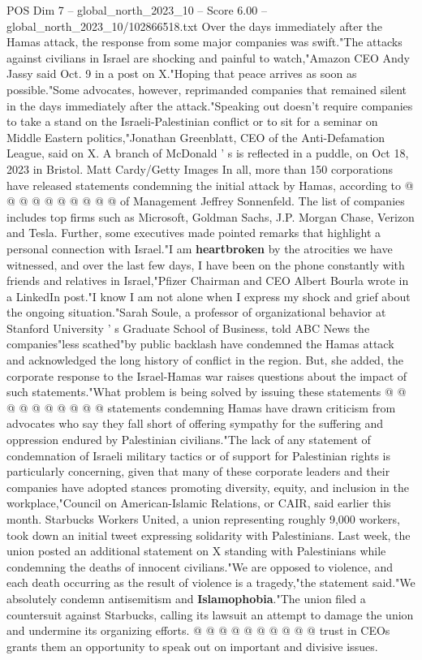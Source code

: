 \begin{textsample}{POS Dim 7 – global\_north\_2023\_10 – Score 6.00 – global\_north\_2023\_10/102866518.txt}
Over the days immediately after the Hamas attack, the response from some major companies was swift."The attacks against civilians in Israel are shocking and painful to watch,"Amazon CEO Andy Jassy said Oct. 9 in a post on X."Hoping that peace arrives as soon as possible."Some advocates, however, reprimanded companies that remained silent in the days immediately after the attack."Speaking out doesn't require companies to take a stand on the Israeli-Palestinian conflict or to sit for a seminar on Middle Eastern politics,"Jonathan Greenblatt, CEO of the Anti-Defamation League, said on X.
A branch of McDonald ' s is reflected in a puddle, on Oct 18, 2023 in Bristol.
Matt Cardy/Getty Images In all, more than 150 corporations have released statements condemning the initial attack by Hamas, according to @ @ @ @ @ @ @ @ @ @ of Management Jeffrey Sonnenfeld.
The list of companies includes top firms such as Microsoft, Goldman Sachs, J.P.
Morgan Chase, Verizon and Tesla.
Further, some executives made pointed remarks that highlight a personal connection with Israel."I am \textbf{heartbroken} by the atrocities we have witnessed, and over the last few days, I have been on the phone constantly with friends and relatives in Israel,"Pfizer Chairman and CEO Albert Bourla wrote in a LinkedIn post."I know I am not alone when I express my shock and grief about the ongoing situation."Sarah Soule, a professor of organizational behavior at Stanford University ' s Graduate School of Business, told ABC News the companies"less scathed"by public backlash have condemned the Hamas attack and acknowledged the long history of conflict in the region.
But, she added, the corporate response to the Israel-Hamas war raises questions about the impact of such statements."What problem is being solved by issuing these statements @ @ @ @ @ @ @ @ @ @ statements condemning Hamas have drawn criticism from advocates who say they fall short of offering sympathy for the suffering and oppression endured by Palestinian civilians."The lack of any statement of condemnation of Israeli military tactics or of support for Palestinian rights is particularly concerning, given that many of these corporate leaders and their companies have adopted stances promoting diversity, equity, and inclusion in the workplace,"Council on American-Islamic Relations, or CAIR, said earlier this month.
Starbucks Workers United, a union representing roughly 9,000 workers, took down an initial tweet expressing solidarity with Palestinians.
Last week, the union posted an additional statement on X standing with Palestinians while condemning the deaths of innocent civilians."We are opposed to violence, and each death occurring as the result of violence is a tragedy,"the statement said."We absolutely condemn antisemitism and \textbf{Islamophobia}."The union filed a countersuit against Starbucks, calling its lawsuit an attempt to damage the union and undermine its organizing efforts. @ @ @ @ @ @ @ @ @ @ trust in CEOs grants them an opportunity to speak out on important and divisive issues.

\end{textsample}
